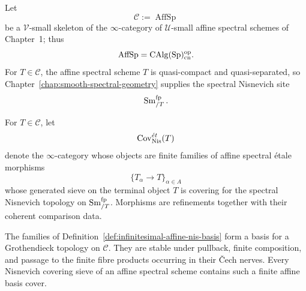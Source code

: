 Let
\[
    \mathcal C:=\operatorname{AffSp}
\]
be a $\mathcal V$-small skeleton of the $\infty$-category of
$\mathcal U$-small affine spectral schemes of Chapter~1; thus
\[
    \operatorname{AffSp}=\operatorname{CAlg}(\mathrm{Sp})_{\mathrm{cn}}^{\mathrm{op}}.
\]
For $T\in\mathcal C$, the affine spectral scheme $T$ is quasi-compact and
quasi-separated, so Chapter~\ref{chap:smooth-spectral-geometry} supplies the
spectral Nisnevich site
\[
    \operatorname{Sm}^{\mathrm{fp}}_{/T}.
\]

\begin{definition}
\label{def:infinitesimal-affine-nis-basis}
For $T\in\mathcal C$, let
\[
    \operatorname{Cov}^{\acute et}_{\mathrm{Nis}}(T)
\]
denote the $\infty$-category whose objects are finite families of affine
spectral \'etale morphisms
\[
    \{T_\alpha\longrightarrow T\}_{\alpha\in A}
\]
whose generated sieve on the terminal object $T$ is covering for the spectral
Nisnevich topology on $\operatorname{Sm}^{\mathrm{fp}}_{/T}$.  Morphisms are
refinements together with their coherent comparison data.
\end{definition}

\begin{proposition}
\label{prop:infinitesimal-affine-nis-basis}
The families of Definition~\ref{def:infinitesimal-affine-nis-basis} form a
basis for a Grothendieck topology on $\mathcal C$.  They are stable under
pullback, finite composition, and passage to the finite fibre products
occurring in their \v{C}ech nerves.  Every Nisnevich covering sieve of an
affine spectral scheme contains such a finite affine basis cover.
\end{proposition}

